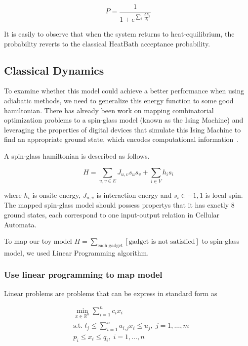 \documentclass[twocolumn,superscriptaddress,english,showpacs,longbibliography]{revtex4-2}
\begin{document}
\begin{equation}
P = \frac{1}{1 + e^{\sum_i \frac{\Delta E_i}{T_i}}}
\end{equation}

It is easily to observe that when the system returns to
heat-equilibrium, the probability reverts to the classical HeatBath
acceptance probability.

\subsection{Classical Dynamics}\label{classical-dynamics}

To examine whether this model could achieve a better performance when
using adiabatic methods, we need to generalize this energy function to
some good hamiltonian. There has already been work on mapping
combinatorial optimization problems to a spin-glass model (known as the
Ising Machine) and leveraging the properties of digital devices that
simulate this Ising Machine to find an appropriate ground state, which
encodes computational information~\cite{Aadit2022,Bybee2023}.

A spin-glass hamiltonian is described as follows.

\begin{equation}
H = \sum_{u,v \in E} J_{u,v}s_us_v + \sum_{i\in V}h_i s_i
\end{equation}

where $h_i$ is onsite energy, $J_{u,v}$ is interaction energy and
$s_i \in {-1, 1}$ is local spin. The mapped spin-glass model should
possess propertys that it has exactly 8 ground states, each correspond
to one input-output relation in Cellular Automata.

To map our toy model
$H = \sum_{\text{each gadget}} [\text{gadget is not satisfied}]$ to
spin-glass model, we used Linear Programming algorithm.

\subsubsection{Use linear programming to map
model}\label{use-linear-programming-to-map-model}

Linear problems are problems that can be express in standard form as

\begin{equation}
    \begin{split}
        &\min_{x \in \mathbb{R}^n} \sum_{i=1}^n c_ix_i\\
        &\text{s.t. } l_j \leq \sum_{i=1}^n a_{i,j}x_i \leq u_j, \; j=1,\ldots,m\\
        &p_i \leq x_i \leq q_i, \; i=1,\ldots, n
    \end{split}
\end{equation}
\end{document}
